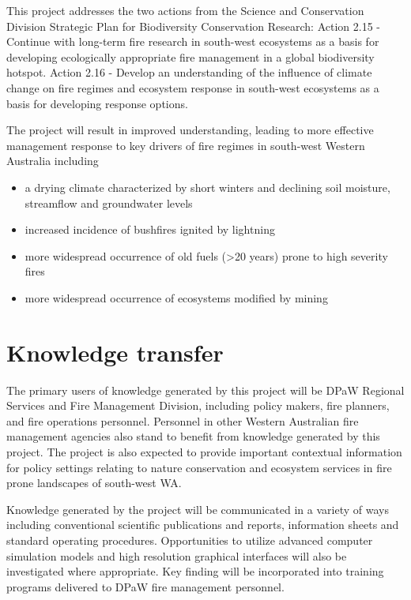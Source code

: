 \documentclass[version=last, paper=a4, DIV=18, usenames, dvipsnames]{scrartcl}
\begin{document}
This project addresses the two actions from the Science and Conservation Division Strategic Plan for Biodiversity Conservation Research:
Action 2.15 - Continue with long-term fire research in south-west ecosystems as a basis for developing ecologically appropriate fire management in a global biodiversity hotspot.
Action 2.16 - Develop an understanding of the influence of climate change on fire regimes and ecosystem response in south-west ecosystems as a basis for developing response options.


The project will result in improved understanding, leading to more effective management response to key drivers of fire regimes in south-west Western Australia including


\begin{itemize}

  \item a drying climate characterized by short winters and declining soil moisture, streamflow and groundwater levels

  \item increased incidence of bushfires ignited by lightning

  \item more widespread occurrence of old fuels (>20 years) prone to high severity fires

  \item more widespread occurrence of ecosystems modified by mining

\end{itemize}






\section{Knowledge transfer}



The primary users of knowledge generated by this project will be DPaW Regional Services and Fire Management Division, including policy makers, fire planners, and fire operations personnel. Personnel in other Western Australian fire management agencies also stand to benefit from knowledge generated by this project. The project is also expected to provide important contextual information for policy settings relating to nature conservation and ecosystem services in fire prone landscapes of south-west WA.


Knowledge generated by the project will be communicated in a variety of ways including conventional scientific publications and reports, information sheets and standard operating procedures. Opportunities to utilize advanced computer simulation models and high resolution graphical interfaces will also be investigated where appropriate. Key finding will be incorporated into training programs delivered to DPaW fire management personnel.
\end{document}
